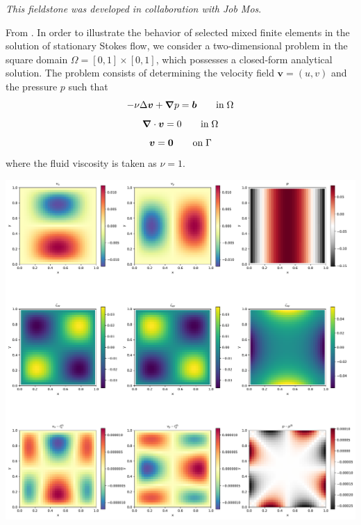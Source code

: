 
{\sl This fieldstone was developed in collaboration with Job Mos}.

From \cite{dohu}. In order to illustrate the behavior of selected mixed finite elements in the solution 
of stationary Stokes flow,  we consider a two-dimensional problem 
in the square domain $\Omega=[0,1]\times[0,1]$, which possesses a closed-form analytical 
solution. The problem consists of determining the velocity field ${\bm v} = (u,v)$ and the 
pressure $p$ such that 
\[
-\nu \Delta {\bm v} + {\bm \nabla} p = {\bm b}  \quad\quad {\rm in} \; \Omega
\]
\[
{\bm \nabla} \cdot {\bm v} = 0 \quad\quad {\rm in} \; \Omega
\]
\[
{\bm v}={\bm 0} \quad\quad {\rm on} \; \Gamma
\]
where the fluid viscosity is taken as $\nu=1$. 



\includegraphics[width=16cm]{python_codes/fieldstone_01/solution.pdf}

